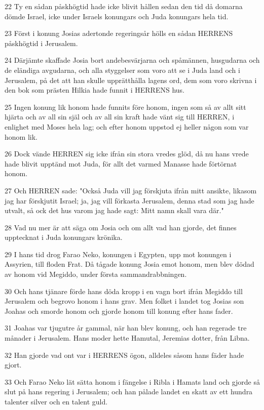 \par 22 Ty en sådan påskhögtid hade icke blivit hållen sedan den tid då domarna dömde Israel, icke under Israels konungars och Juda konungars hela tid.
\par 23 Först i konung Josias adertonde regeringsår hölls en sådan HERRENS påskhögtid i Jerusalem.
\par 24 Därjämte skaffade Josia bort andebesvärjarna och spåmännen, husgudarna och de eländiga avgudarna, och alla styggelser som voro att se i Juda land och i Jerusalem, på det att han skulle upprätthålla lagens ord, dem som voro skrivna i den bok som prästen Hilkia hade funnit i HERRENS hus.
\par 25 Ingen konung lik honom hade funnits före honom, ingen som så av allt sitt hjärta och av all sin själ och av all sin kraft hade vänt sig till HERREN, i enlighet med Moses hela lag; och efter honom uppstod ej heller någon som var honom lik.
\par 26 Dock vände HERREN sig icke ifrån sin stora vredes glöd, då nu hans vrede hade blivit upptänd mot Juda, för allt det varmed Manasse hade förtörnat honom.
\par 27 Och HERREN sade: "Också Juda vill jag förskjuta ifrån mitt ansikte, likasom jag har förskjutit Israel; ja, jag vill förkasta Jerusalem, denna stad som jag hade utvalt, så ock det hus varom jag hade sagt: Mitt namn skall vara där."
\par 28 Vad nu mer är att säga om Josia och om allt vad han gjorde, det finnes upptecknat i Juda konungars krönika.
\par 29 I hans tid drog Farao Neko, konungen i Egypten, upp mot konungen i Assyrien, till floden Frat. Då tågade konung Josia emot honom, men blev dödad av honom vid Megiddo, under första sammandrabbningen.
\par 30 Och hans tjänare förde hans döda kropp i en vagn bort ifrån Megiddo till Jerusalem och begrovo honom i hans grav. Men folket i landet tog Josias son Joahas och smorde honom och gjorde honom till konung efter hans fader.
\par 31 Joahas var tjugutre år gammal, när han blev konung, och han regerade tre månader i Jerusalem. Hans moder hette Hamutal, Jeremias dotter, från Libna.
\par 32 Han gjorde vad ont var i HERRENS ögon, alldeles såsom hans fäder hade gjort.
\par 33 Och Farao Neko lät sätta honom i fängelse i Ribla i Hamats land och gjorde så slut på hans regering i Jerusalem; och han pålade landet en skatt av ett hundra talenter silver och en talent guld.
